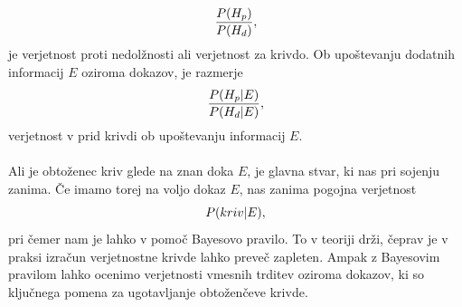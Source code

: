 \documentclass[12pt,a4paper]{amsart}
\theoremstyle{definition} %
\theoremstyle{plain} %
\begin{document}
\begin{equation}
   \frac{P(H_p)}{P(H_d)}, \vspace{2mm}
\end{equation}
je verjetnost proti nedolžnosti ali verjetnost za krivdo. Ob upoštevanju dodatnih informacij $E$ oziroma dokazov, je razmerje
\begin{equation}
   \frac{P(H_p \lvert E)}{P(H_d \lvert E)} \vspace{2mm},
\end{equation}
verjetnost v prid krivdi ob upoštevanju informacij $E$.\\\\
Ali je obtoženec kriv glede na znan doka $E$, je glavna stvar, ki nas pri sojenju zanima. Če imamo torej na voljo dokaz $E$, nas zanima pogojna 
verjetnost
\[
    P(kriv \lvert E), \vspace{2mm}
\]
pri čemer nam je lahko v pomoč Bayesovo pravilo. To v teoriji drži, čeprav je v praksi izračun verjetnostne krivde lahko preveč zapleten. Ampak 
z Bayesovim pravilom lahko ocenimo verjetnosti vmesnih trditev oziroma dokazov, ki so ključnega pomena za ugotavljanje obtoženčeve krivde.

\end{document}
